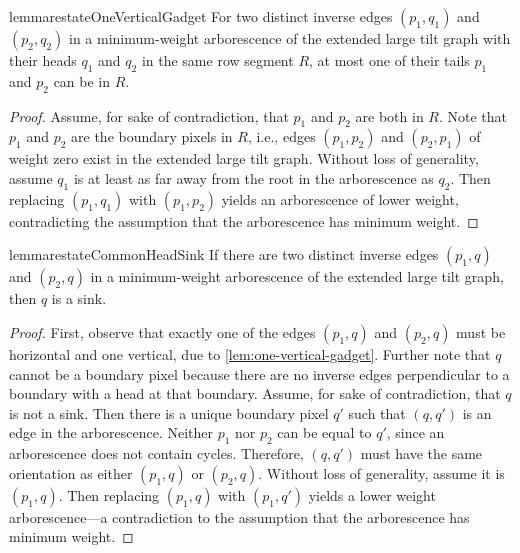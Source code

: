 \documentclass[a4paper,UKenglish,cleveref,thm-restate]{lipics-v2021}
\begin{document}
\begin{restatable}{lemma}{restateOneVerticalGadget}\label{lem:one-vertical-gadget}
For two distinct inverse edges $(p_1,q_1)$ and $(p_2,q_2)$ in a minimum-weight
arborescence of the extended large tilt graph with their heads $q_1$ and $q_2$
in the same row segment $R$, at most one of their tails $p_1$ and $p_2$ can be
in $R$.
\end{restatable}
\begin{proof}
    Assume, for sake of contradiction, that $p_1$ and $p_2$ are both in $R$. Note
    that $p_1$ and $p_2$ are the boundary pixels in $R$, i.e., edges $(p_1,p_2)$ and
    $(p_2,p_1)$ of weight zero exist in the extended large tilt graph. Without loss
    of generality, assume $q_1$ is at least as far away from the root in the
    arborescence as $q_2$. Then replacing $(p_1,q_1)$ with $(p_1,p_2)$ yields an
    arborescence of lower weight, contradicting the assumption that the arborescence
    has minimum weight.
\end{proof}

\begin{restatable}{lemma}{restateCommonHeadSink}\label{common_head_sink}
If there are two distinct inverse edges $(p_1,q)$ and $(p_2,q)$ in a
minimum-weight arborescence of the extended large tilt graph, then $q$ is a
sink.
\end{restatable}
\begin{proof}
    First, observe that exactly one of the edges $(p_1,q)$ and $(p_2,q)$ must be
    horizontal and one vertical, due to \cref{lem:one-vertical-gadget}. Further note
    that $q$ cannot be a boundary pixel because there are no inverse edges
    perpendicular to a boundary with a head at that boundary. Assume, for sake of
    contradiction, that $q$ is not a sink. Then there is a unique boundary pixel
    $q'$ such that $(q,q')$ is an edge in the arborescence. Neither $p_1$ nor $p_2$
    can be equal to $q'$, since an arborescence does not contain cycles. Therefore,
    $(q,q')$ must have the same orientation as either $(p_1,q)$ or
    $(p_2,q)$. Without loss of generality, assume it is $(p_1,q)$. Then replacing
    $(p_1,q)$ with $(p_1,q')$ yields a lower weight arborescence---a contradiction to
    the assumption that the arborescence has minimum weight.
\end{proof}
\end{document}
